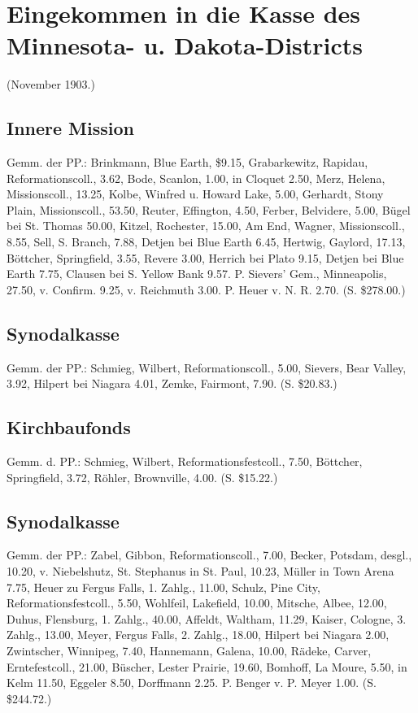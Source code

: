 \chapter[Minnesota- u. Dakota-Districts]{Eingekommen in die Kasse des Minnesota- u. Dakota-Districts}

(November 1903.)

\section{Innere Mission}
Gemm. der PP.: Brinkmann, Blue Earth, \$9.15, Grabarkewitz, Rapidau, Reformationscoll., 3.62, Bode, Scanlon, 1.00, in Cloquet 2.50, Merz, Helena, Missionscoll., 13.25, Kolbe, Winfred u. Howard Lake, 5.00, Gerhardt, Stony Plain, Missionscoll., 53.50, Reuter, Effington, 4.50, Ferber, Belvidere, 5.00, Bügel bei St. Thomas 50.00, Kitzel, Rochester, 15.00, Am End, Wagner, Missionscoll., 8.55, Sell, S. Branch, 7.88, Detjen bei Blue Earth 6.45, Hertwig, Gaylord, 17.13, Böttcher, Springfield, 3.55, Revere 3.00, Herrich bei Plato 9.15, Detjen bei Blue Earth 7.75, Clausen bei S. Yellow Bank 9.57. P. Sievers’ Gem., Minneapolis, 27.50, v. Confirm. 9.25, v. Reichmuth 3.00. P. Heuer v. N. R. 2.70. (S. \$278.00.)

\section{Synodalkasse}
Gemm. der PP.: Schmieg, Wilbert, Reformationscoll., 5.00, Sievers, Bear Valley, 3.92, Hilpert bei Niagara 4.01, Zemke, Fairmont, 7.90. (S. \$20.83.)

\section{Kirchbaufonds}
Gemm. d. PP.: Schmieg, Wilbert, Reformationsfestcoll., 7.50, Böttcher, Springfield, 3.72, Röhler, Brownville, 4.00. (S. \$15.22.)

\section{Synodalkasse}
Gemm. der PP.: Zabel, Gibbon, Reformationscoll., 7.00, Becker, Potsdam, desgl., 10.20, v. Niebelshutz, St. Stephanus in St. Paul, 10.23, Müller in Town Arena 7.75, Heuer zu Fergus Falls, 1. Zahlg., 11.00, Schulz, Pine City, Reformationsfestcoll., 5.50, Wohlfeil, Lakefield, 10.00, Mitsche, Albee, 12.00, Duhus, Flensburg, 1. Zahlg., 40.00, Affeldt, Waltham, 11.29, Kaiser, Cologne, 3. Zahlg., 13.00, Meyer, Fergus Falls, 2. Zahlg., 18.00, Hilpert bei Niagara 2.00, Zwintscher, Winnipeg, 7.40, Hannemann, Galena, 10.00, Rädeke, Carver, Erntefestcoll., 21.00, Büscher, Lester Prairie, 19.60, Bomhoff, La Moure, 5.50, in Kelm 11.50, Eggeler 8.50, Dorffmann 2.25. P. Benger v. P. Meyer 1.00. (S. \$244.72.)

